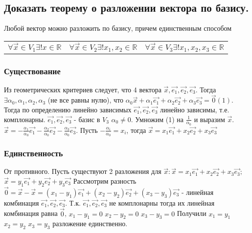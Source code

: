 \documentclass[a4paper, 10pt]{article}
\begin{document}
\subsection{Доказать теорему о разложении вектора по базису.}

\begin{center}
Любой вектор можно разложить по базису, причем единственным способом
\begin{tabular}{c c c} 
    $\forall \vec{x} \in V_1 \exists ! x \in \mathbb{R}$&
    $\forall \vec{x} \in V_2 \exists ! x_1, x_2 \in \mathbb{R}$&
    $\forall \vec{x} \in V_3 \exists ! x_1, x_2, x_3 \in \mathbb{R}$\\
\end{tabular}
\end{center}

\subsubsection{Существование}

Из геометрических критериев следует, что 4 вектора $\vec{x}, \vec{e_1}, \vec{e_2}, \vec{e_3}$.
Тогда $\exists \alpha_0, \alpha_1, \alpha_2, \alpha_3$ (не все равны нулю), что
$\alpha_0\vec{x} + \alpha_1\vec{e_1} + \alpha_2\vec{e_2} + \alpha_3\vec{e_3} = \vec{0} (1)$.
Тогда по определению линейно зависимых $\vec{e_1}, \vec{e_2}, \vec{e_3}$ линейно зависимы,
т.е. комплонарны. $\vec{e_1}, \vec{e_2}, \vec{e_3}$ - базис в $V_3$ $\alpha_0 \ne 0$.
Умножим (1) на $\frac{1}{\alpha_0}$ и выразим $\vec{x}$. 
$\vec{x} = -\frac{\alpha_1}{\alpha_0}\vec{e_1}-\frac{\alpha_2}{\alpha_0}\vec{e_2}
-\frac{\alpha_3}{\alpha_0}\vec{e_3}$. Пусть $-\frac{\alpha_i}{\alpha_0} = x_i$, тогда
$\vec{x} = x_1\vec{e_1} + x_2\vec{e_2} + x_3\vec{e_3}$

\subsubsection{Единственность}

От противного. Пусть существуют 2 разложения для 
$\vec{x}: \vec{x} = x_1\vec{e_1} + x_2\vec{e_2} + x_3\vec{e_3};$
$\vec{x} = y_1\vec{e_1} + y_2\vec{e_2} + y_3\vec{e_3}$
Рассмотрим разность $\vec{0} = \vec{x} - \vec{x} = 
(x_1 - y_1)\vec{e_1} + (x_2 - y_2)\vec{e_2} + (x_3 - y_3)\vec{e_3}$ - линейная комбинация 
$\vec{e_1}, \vec{e_2}, \vec{e_3}$. Т.к. $\vec{e_1}, \vec{e_2}, \vec{e_3}$ не комплонарны
тогда их линейная комбинация равна $\vec{0}$, $x_1 - y_1 = 0$ $x_2 - y_2 = 0$ $x_3 - y_3 = 0$
Получили $x_1 = y_1$ $x_2 = y_2$ $x_3 = y_3$ разложение единственно.
\end{document}
